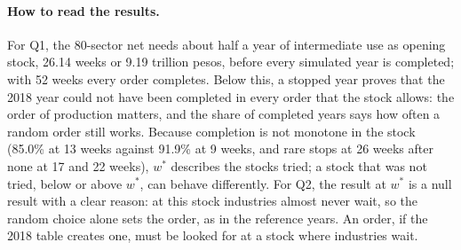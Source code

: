 \documentclass[11pt]{article}
\begin{document}
\paragraph{How to read the results.} For Q1, the 80-sector net needs about half a year of intermediate use as opening stock, 26.14 weeks or 9.19 trillion pesos, before every simulated year is completed; with 52 weeks every order completes. Below this, a stopped year proves that the 2018 year could not have been completed in every order that the stock allows: the order of production matters, and the share of completed years says how often a random order still works. Because completion is not monotone in the stock (85.0\% at 13 weeks against 91.9\% at 9 weeks, and rare stops at 26 weeks after none at 17 and 22 weeks), $w^*$ describes the stocks tried; a stock that was not tried, below or above $w^*$, can behave differently. For Q2, the result at $w^*$ is a null result with a clear reason: at this stock industries almost never wait, so the random choice alone sets the order, as in the reference years. An order, if the 2018 table creates one, must be looked for at a stock where industries wait.
\end{document}
